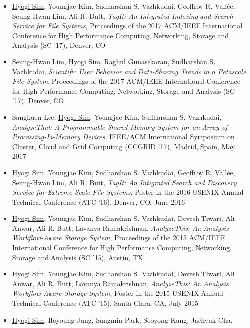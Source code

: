 \begin{itemize}
  {\it Diving into Petascale Production File Systems through
       Large Scale Profiling and Analysis},
  In Proceedings of the 2nd Joint International Workshop on Parallel Data Storage
  \& Data Intensive Scalable Computing Systems (PDSW-DISC '17)
  in conjunction with SC, Denver, CO
\item \underline{Hyogi Sim}, Youngjae Kim, Sudharshan S. Vazhkudai,
  Geoffroy R. Vall\'ee, Seung-Hwan Lim, Ali R. Butt,
  {\it TagIt: An Integrated Indexing and Search Service for File Systems},
  Proceedings of the 2017 ACM/IEEE International Conference for High
  Performance Computing, Networking, Storage and Analysis (SC '17), Denver, CO
\item Seung-Hwan Lim, \underline{Hyogi Sim}, Raghul Gunasekaran,
  Sudharshan S. Vazhkudai,
  {\it Scientific User Behavior and Data-Sharing Trends in a Petascale File System},
  Proceedings of the 2017 ACM/IEEE International Conference for High
  Performance Computing, Networking, Storage and Analysis (SC '17), Denver, CO
\item Sangkuen Lee, \underline{Hyogi Sim}, Youngjae Kim,
  Sudharshan S. Vazhkudai,
  {\it AnalyzeThat: A Programmable Shared-Memory System for an Array of Processing-In-Memory Devices},
  IEEE/ACM International Symposium on Cluster, Cloud and Grid Computing
  (CCGRID '17), Madrid, Spain, May 2017
\item \underline{Hyogi Sim}, Youngjae Kim, Sudharshan S. Vazhkudai,
  Geoffroy R. Vall\'ee, Seung-Hwan Lim, Ali R. Butt,
  {\it TagIt: An Integrated Search and Discovery Service for Extreme-Scale File
  Systems},
  Poster in the 2016 USENIX Annual Technical Conference (ATC '16),
  Denver, CO, June 2016 %
\item \underline{Hyogi Sim}, Youngjae Kim, Sudharshan S. Vazhkudai,
  Devesh Tiwari, Ali Anwar, Ali R. Butt, Lavanya Ramakrishnan,
  {\it AnalyzeThis: An Analysis Workflow-Aware Storage System},
  Proceedings of the 2015 ACM/IEEE International Conference for High
  Performance Computing, Networking, Storage and Analysis (SC '15), Austin, TX
\item \underline{Hyogi Sim}, Youngjae Kim, Sudharshan S. Vazhkudai,
  Devesh Tiwari, Ali Anwar, Ali R. Butt, Lavanya Ramakrishnan,
  {\it AnalyzeThis: An Analysis Workflow-Aware Storage System},
  Poster in the 2015 USENIX Annual Technical Conference (ATC '15),
  Santa Clara, CA, July 2015
\item \underline{Hyogi Sim}, Hoyoung Jung, Sungmin Park, Sooyong Kang, Jaehyuk Cha,

\end{itemize}
